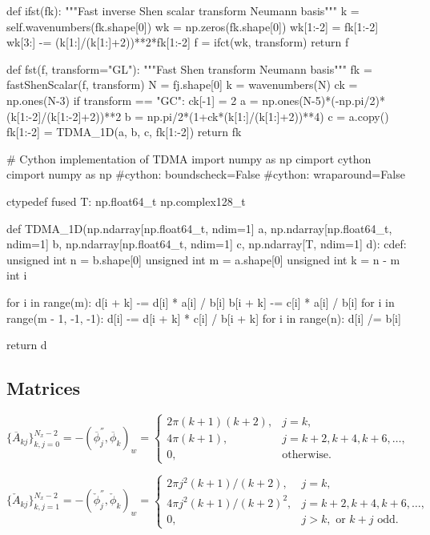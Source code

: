 \documentclass[11pt, oneside]{article}
\newcommand{\N}[1]{\check{#1}}
\newcommand{\D}[1]{\overline{#1}}
\begin{document}
\begin{python}
def ifst(fk):
    """Fast inverse Shen scalar transform Neumann basis"""
    k = self.wavenumbers(fk.shape[0])
    wk = np.zeros(fk.shape[0])    
    wk[1:-2] = fk[1:-2]
    wk[3:] -= (k[1:]/(k[1:]+2))**2*fk[1:-2]
    f = ifct(wk, transform)
    return f
        
def fst(f, transform="GL"):
    """Fast Shen transform Neumann basis"""
    fk = fastShenScalar(f, transform)
    N = fj.shape[0]
    k = wavenumbers(N)
    ck = np.ones(N-3)
    if transform == "GC": ck[-1] = 2
    a = np.ones(N-5)*(-np.pi/2)*(k[1:-2]/(k[1:-2]+2))**2
    b = np.pi/2*(1+ck*(k[1:]/(k[1:]+2))**4)
    c = a.copy()
    fk[1:-2] = TDMA_1D(a, b, c, fk[1:-2])
    return fk

# Cython implementation of TDMA    
import numpy as np
cimport cython
cimport numpy as np
#cython: boundscheck=False
#cython: wraparound=False

ctypedef fused T:
    np.float64_t
    np.complex128_t

def TDMA_1D(np.ndarray[np.float64_t, ndim=1] a, 
            np.ndarray[np.float64_t, ndim=1] b, 
            np.ndarray[np.float64_t, ndim=1] c, 
            np.ndarray[T, ndim=1] d):
    cdef:
        unsigned int n = b.shape[0]
        unsigned int m = a.shape[0]
        unsigned int k = n - m
        int i
        
    for i in range(m):
        d[i + k] -= d[i] * a[i] / b[i]
        b[i + k] -= c[i] * a[i] / b[i]
    for i in range(m - 1, -1, -1):
        d[i] -= d[i + k] * c[i] / b[i + k]
    for i in range(n):
        d[i] /= b[i]
        
    return d
    

\end{python}
\subsection*{Matrices}


\begin{equation}
 \{\D{A}_{kj}\}_{k,j=0}^{N_x-2} = -\left(\D{\phi}^{''}_{j}, \D{\phi}_{k} \right)_w = \begin{cases}
 2\pi(k+1)(k+2), &j=k,\\
 4\pi(k+1), & j=k+2, k+4, k+6, \ldots, \\
 0, &\text{otherwise}.
 \end{cases}
\end{equation}

\begin{equation}
 \{\N{A}_{kj}\}_{k,j=1}^{N_x-2} = -\left(\N{\phi}^{''}_{j}, \N{\phi}_{k} \right)_w = \begin{cases}
 2\pi j^2(k+1)/(k+2), &j=k,\\
 4\pi j^2(k+1)/(k+2)^2, & j=k+2, k+4, k+6, \ldots, \\
 0, &j>k, \text{ or } k+j \text{ odd}.
 \end{cases}
\end{equation}
\end{document}
